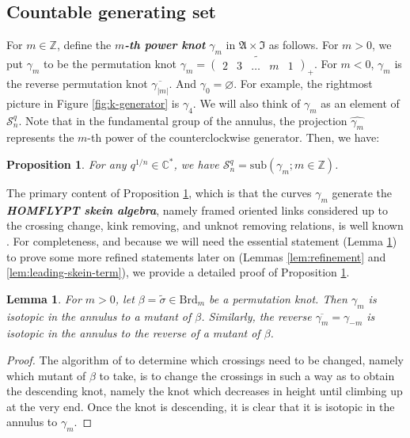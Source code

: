 \documentclass[12pt,
	]{amsart}
\newtheorem{proposition}[theorem]{Proposition}
\newtheorem{lemma}[theorem]{Lemma}
\theoremstyle{definition}
\renewcommand{\bar}{\overline}
\renewcommand{\tilde}{\widetilde}
\renewcommand{\hat}{\widehat}
\renewcommand{\emptyset}{\varnothing}
\newcommand{\mrm}[1]{\mathrm{#1}}
\newcommand{\mbb}[1]{\mathbb{#1}}
\newcommand{\mcal}[1]{\mathcal{#1}}
\newcommand{\mfrak}[1]{\mathfrak{#1}}
\newcommand{\lp}{\left(}\newcommand{\rp}{\right)}
\newcommand{\define}[1]{{\textit{\textbf{#1}}}}
\newcommand{\sub}[1]{\mrm{sub}\lp#1\rp}
\newcommand{\bmat}{\lp\begin{smallmatrix}}\newcommand{\emat}{\end{smallmatrix}\rp}
\newcommand{\rev}[1]{\bar{#1}}
\newcommand{\proj}[1]{\hat{#1}}
\newcommand{\lift}[1]{\tilde{#1}}
\newcommand{\Z}{\mbb{Z}}
\newcommand{\C}{\mbb{C}}
\newcommand{\sC}{\C^\ast}
\newcommand{\sk}{\mcal{S}_n^q}
\newcommand{\ann}{\mfrak{A}}
\newcommand{\intt}{\mfrak{I}}
\newcommand{\qroot}{q^{1/n}}
\newcommand{\braid}{\mrm{Brd}}
\begin{document}
\subsection{Countable generating set}\label{ssec:intermediate-statement}

For $m\in\Z$, define the \define{$m$-th power knot} $\gamma_m$ in $\ann\times\intt$ as follows.  For $m>0$, we put $\gamma_m$ to be the permutation knot $\gamma_m=\lift{\bmat2&3&\hdots&m&1\emat}_+$.  For $m<0$, $\gamma_m$ is the reverse permutation knot  $\rev{\gamma_{|m|}}$. And $\gamma_0=\emptyset$.  For example, the rightmost picture in Figure \ref{fig:k-generator} is $\gamma_4$.  We will also think of $\gamma_m$ as an element of $\sk$.  Note that in the fundamental group of the annulus, the projection $\proj{\gamma_m}$ represents the $m$-th power of the counterclockwise generator.  Then, we have:

\begin{proposition}\label{prop:gammas-generate}
For any $\qroot\in\sC$, we have $\sk=\sub{\gamma_m;m\in\Z}$.  \end{proposition}

The primary content of Proposition \ref{prop:gammas-generate}, which is that the curves $\gamma_m$ generate the \define{HOMFLYPT skein algebra}, namely framed oriented links considered up to the crossing change, kink removing, and unknot removing relations, is well known \cite{lickorishMR0918536}.  For completeness, and because we will need the essential statement (Lemma \ref{lem:isotopic-in-the-annulus}) to prove some more refined statements later on (Lemmas \ref{lem:refinement} and \ref{lem:leading-skein-term}), we provide a detailed proof of Proposition \ref{prop:gammas-generate}.  

\begin{lemma}\label{lem:isotopic-in-the-annulus}
For $m>0$, let $\beta=\lift{\sigma}\in\braid_m$ be a permutation knot.  Then $\gamma_m$ is isotopic in the annulus to a mutant of $\beta$.  Similarly, the reverse $\rev{\gamma_m}=\gamma_{-m}$ is isotopic in the annulus to the reverse  of a mutant of $\beta$.
\end{lemma}

\begin{proof}
The algorithm of \cite{lickorishMR0918536} to determine which crossings need to be changed, namely which mutant of $\beta$ to take, is to change the crossings in such a way as to obtain the descending knot, namely the knot which  decreases in height until  climbing up at the very end.  Once the knot is  descending, it is clear that it is isotopic in the annulus to $\gamma_m$.  
\end{proof}
\end{document}

